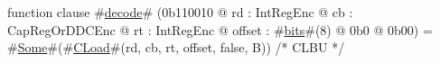 function clause #\hyperref[zdecode]{decode}# (0b110010 @ rd : IntRegEnc @ cb : CapRegOrDDCEnc @ rt : IntRegEnc @ offset : #\hyperref[zbits]{bits}#(8) @ 0b0 @ 0b00) = #\hyperref[zSome]{Some}#(#\hyperref[zCLoad]{CLoad}#(rd, cb, rt, offset, false, B)) /* CLBU */
